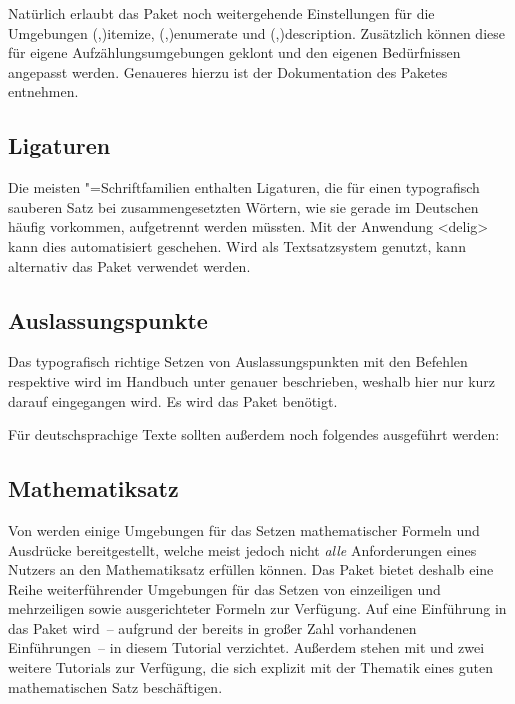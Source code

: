 \documentclass[%
  english,ngerman,%
  cdgeometry=no,DIV=12,%
  cd=false,cdfont=false,cdtitle=true,%
  headings=normal,%
  automark,%
  listof=toc,%
]{tudscrartcl}
\begin{document}
Natürlich erlaubt das Paket noch weitergehende Einstellungen für die Umgebungen 
\Environment(,){itemize},
\Environment(,){enumerate} und
\Environment(,){description}. 
Zusätzlich können diese für eigene Aufzählungsumgebungen geklont und den 
eigenen Bedürfnissen angepasst werden. Genaueres hierzu ist der Dokumentation 
des Paketes  entnehmen.



\subsection{Ligaturen}

Die meisten "=Schriftfamilien enthalten Ligaturen, die für 
einen typografisch sauberen Satz bei zusammengesetzten Wörtern, wie sie gerade 
im Deutschen häufig vorkommen, aufgetrennt werden müssten. Mit der Anwendung 
<delig> kann dies automatisiert geschehen. Wird 
 als Textsatzsystem genutzt, kann alternativ das Paket 
 verwendet werden.



\subsection{Auslassungspunkte}

Das typografisch richtige Setzen von Auslassungspunkten mit den Befehlen 
 respektive  wird im Handbuch unter 
 genauer 
beschrieben, weshalb hier nur kurz darauf eingegangen wird. Es wird das Paket 
 benötigt.
%
\begin{Preamble}
\usepackage{ellipsis}
\end{Preamble}
%
Für deutschsprachige Texte sollten außerdem noch folgendes ausgeführt werden:
%
\begin{Preamble}
\let\ellipsispunctuation\relax

\end{Preamble}



\subsection{Mathematiksatz}

Von  werden einige Umgebungen für das Setzen mathematischer 
Formeln und Ausdrücke bereitgestellt, welche meist jedoch nicht \emph{alle} 
Anforderungen eines Nutzers an den Mathematiksatz erfüllen können. Das Paket
 bietet deshalb eine Reihe weiterführender Umgebungen für das 
Setzen von einzeiligen und mehrzeiligen sowie ausgerichteter Formeln zur 
Verfügung. Auf eine Einführung in das Paket wird~-- aufgrund der bereits in 
großer Zahl vorhandenen Einführungen~-- in diesem Tutorial verzichtet. Außerdem 
stehen mit  und  zwei weitere Tutorials 
zur Verfügung, die sich explizit mit der Thematik eines guten mathematischen 
Satz beschäftigen.
\end{document}
